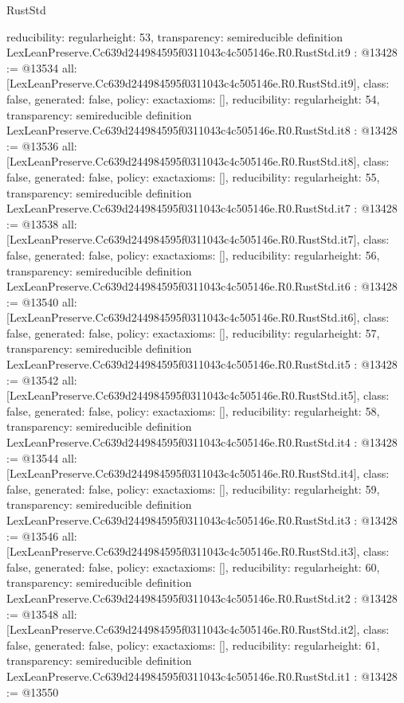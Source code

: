 \begin{lexlean}{RustStd}
\begin{coremodule}
{  reducibility: regular{height: 53},
  transparency: semireducible
}
definition LexLeanPreserve.Cc639d244984595f0311043c4c505146e.R0.RustStd.it9 : @13428 := @13534 {
  all: [LexLeanPreserve.Cc639d244984595f0311043c4c505146e.R0.RustStd.it9],
  class: false,
  generated: false,
  policy: exact{axioms: []},
  reducibility: regular{height: 54},
  transparency: semireducible
}
definition LexLeanPreserve.Cc639d244984595f0311043c4c505146e.R0.RustStd.it8 : @13428 := @13536 {
  all: [LexLeanPreserve.Cc639d244984595f0311043c4c505146e.R0.RustStd.it8],
  class: false,
  generated: false,
  policy: exact{axioms: []},
  reducibility: regular{height: 55},
  transparency: semireducible
}
definition LexLeanPreserve.Cc639d244984595f0311043c4c505146e.R0.RustStd.it7 : @13428 := @13538 {
  all: [LexLeanPreserve.Cc639d244984595f0311043c4c505146e.R0.RustStd.it7],
  class: false,
  generated: false,
  policy: exact{axioms: []},
  reducibility: regular{height: 56},
  transparency: semireducible
}
definition LexLeanPreserve.Cc639d244984595f0311043c4c505146e.R0.RustStd.it6 : @13428 := @13540 {
  all: [LexLeanPreserve.Cc639d244984595f0311043c4c505146e.R0.RustStd.it6],
  class: false,
  generated: false,
  policy: exact{axioms: []},
  reducibility: regular{height: 57},
  transparency: semireducible
}
definition LexLeanPreserve.Cc639d244984595f0311043c4c505146e.R0.RustStd.it5 : @13428 := @13542 {
  all: [LexLeanPreserve.Cc639d244984595f0311043c4c505146e.R0.RustStd.it5],
  class: false,
  generated: false,
  policy: exact{axioms: []},
  reducibility: regular{height: 58},
  transparency: semireducible
}
definition LexLeanPreserve.Cc639d244984595f0311043c4c505146e.R0.RustStd.it4 : @13428 := @13544 {
  all: [LexLeanPreserve.Cc639d244984595f0311043c4c505146e.R0.RustStd.it4],
  class: false,
  generated: false,
  policy: exact{axioms: []},
  reducibility: regular{height: 59},
  transparency: semireducible
}
definition LexLeanPreserve.Cc639d244984595f0311043c4c505146e.R0.RustStd.it3 : @13428 := @13546 {
  all: [LexLeanPreserve.Cc639d244984595f0311043c4c505146e.R0.RustStd.it3],
  class: false,
  generated: false,
  policy: exact{axioms: []},
  reducibility: regular{height: 60},
  transparency: semireducible
}
definition LexLeanPreserve.Cc639d244984595f0311043c4c505146e.R0.RustStd.it2 : @13428 := @13548 {
  all: [LexLeanPreserve.Cc639d244984595f0311043c4c505146e.R0.RustStd.it2],
  class: false,
  generated: false,
  policy: exact{axioms: []},
  reducibility: regular{height: 61},
  transparency: semireducible
}
definition LexLeanPreserve.Cc639d244984595f0311043c4c505146e.R0.RustStd.it1 : @13428 := @13550 {
}
\end{coremodule}
\end{lexlean}
